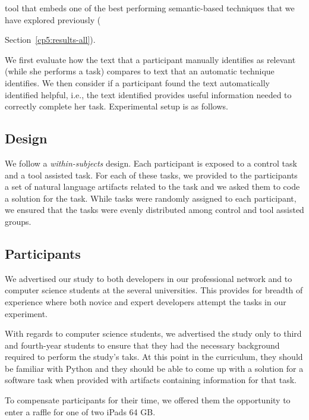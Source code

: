  tool that embeds one of the best performing semantic-based techniques that we have explored previously ({Section~\ref{cp5:results-all}). 


We first evaluate how the text that a participant manually identifies as relevant (while she performs a task) 
compares to text that an automatic technique identifies. 
We then consider if a participant found the text automatically identified helpful, i.e., the text identified provides useful information needed to correctly complete her task.
Experimental setup is as follows.








\subsection{Design}


We follow a \textit{within-subjects} design. Each participant is exposed to a control task and a tool assisted task. For each of these tasks, we provided to the participants a set of natural language artifacts related to the task
and we asked them to code a solution for the task. While tasks were randomly assigned to each participant, 
we ensured that the tasks were evenly distributed among control and tool assisted groups. 






\subsection{Participants}



We advertised our study to both developers in our professional network and to computer science students at the several universities. 
This provides for breadth of experience where both novice and expert developers attempt the tasks in our experiment. 


With regards to computer science students, we advertised the study only to third and fourth-year students to ensure that they had the necessary background required to perform the study's taks.
At this point in the curriculum, they should be familiar with Python and they should be able to come up with a solution 
for a software task when provided with artifacts containing information for that task.


To compensate participants for their time, we offered them the opportunity to enter a raffle for one of two iPads 64 GB.




}
